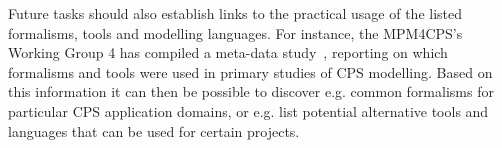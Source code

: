 \documentclass[final]{include/MPM4CPS/MPM4CPS-Report} %
\begin{document}
Future tasks should also establish links to the practical usage of the listed formalisms, tools and modelling languages. For instance, the MPM4CPS's Working Group 4 has compiled a meta-data study~\cite{barisic_wg44}, reporting on which formalisms and tools were used in primary studies of CPS modelling. 
Based on this information it can then be possible to discover e.g. common formalisms for particular CPS application domains, or e.g. list potential alternative tools and languages that can be used for certain projects. 

\end{document}

